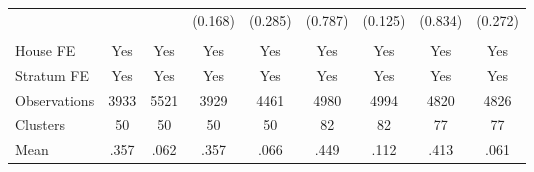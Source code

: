{\begin{tabular}{l*{8}{c}}
                &         &         &  (0.168)&  (0.285)&  (0.787)&  (0.125)&  (0.834)&  (0.272)\\
                &         &         &         &         &         &         &         &         \\
House FE        &      Yes&      Yes&      Yes&      Yes&      Yes&      Yes&      Yes&      Yes\\
Stratum FE      &      Yes&      Yes&      Yes&      Yes&      Yes&      Yes&      Yes&      Yes\\
\midrule
Observations    &     3933&     5521&     3929&     4461&     4980&     4994&     4820&     4826\\
Clusters        &       50&       50&       50&       50&       82&       82&       77&       77\\
Mean            &     .357&     .062&     .357&     .066&     .449&     .112&     .413&     .061\\
\bottomrule
\end{tabular}
}

